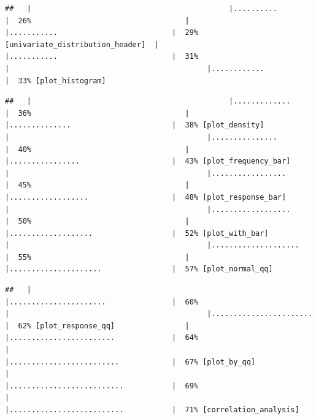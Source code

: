 \documentclass[
]{article}
\begin{document}
\begin{verbatim}
##   |                                             |..........                           |  26%                                   |                                             |...........                          |  29% [univariate_distribution_header]  |                                             |...........                          |  31%                                   |                                             |............                         |  33% [plot_histogram]
\end{verbatim}

\begin{verbatim}
##   |                                             |.............                        |  36%                                   |                                             |..............                       |  38% [plot_density]                    |                                             |...............                      |  40%                                   |                                             |................                     |  43% [plot_frequency_bar]              |                                             |.................                    |  45%                                   |                                             |..................                   |  48% [plot_response_bar]               |                                             |..................                   |  50%                                   |                                             |...................                  |  52% [plot_with_bar]                   |                                             |....................                 |  55%                                   |                                             |.....................                |  57% [plot_normal_qq]
\end{verbatim}

\begin{verbatim}
##   |                                             |......................               |  60%                                   |                                             |.......................              |  62% [plot_response_qq]                |                                             |........................             |  64%                                   |                                             |.........................            |  67% [plot_by_qq]                      |                                             |..........................           |  69%                                   |                                             |..........................           |  71% [correlation_analysis]
\end{verbatim}
\end{document}
